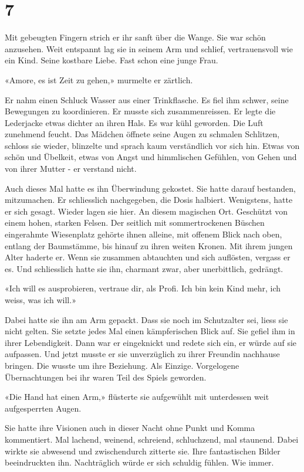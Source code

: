 \chapter{7}



Mit gebeugten Fingern strich er ihr sanft über die Wange. Sie war schön
anzusehen. Weit entspannt lag sie in seinem Arm und schlief, vertrauensvoll wie ein Kind. 
Seine kostbare Liebe. Fast schon eine junge Frau.

«Amore, es ist Zeit zu gehen,» murmelte er zärtlich.
 
Er nahm einen Schluck Wasser aus einer Trinkflasche. Es fiel ihm schwer,
seine Bewegungen zu koordinieren. Er musste sich zusammenreissen.
Er legte die Lederjacke etwas dichter an ihren Hals. Es war kühl
geworden. Die Luft zunehmend feucht.
Das Mädchen öffnete seine Augen zu schmalen Schlitzen, schloss sie
wieder, blinzelte und sprach kaum verständlich vor sich hin. Etwas von
schön und Übelkeit, etwas von Angst und himmlischen Gefühlen, von Gehen
und von ihrer Mutter - er verstand nicht.

Auch dieses Mal hatte es ihn Überwindung gekostet. Sie hatte darauf
bestanden, mitzumachen. Er schliesslich nachgegeben, die Dosis halbiert.
Wenigstens, hatte er sich gesagt.
Wieder lagen sie hier. An diesem magischen Ort. Geschützt von einem
hohen, starken Felsen. Der seitlich mit sommertrockenen Büschen
eingerahmte Wiesenplatz gehörte ihnen alleine, mit offenem Blick nach
oben, entlang der Baumstämme, bis hinauf zu ihren weiten Kronen.
Mit ihrem jungen Alter haderte er. Wenn sie zusammen abtauchten und sich auflösten, 
vergass er es. Und schliesslich hatte sie ihn, charmant
zwar, aber unerbittlich, gedrängt.

«Ich will es ausprobieren, vertraue dir, als Profi. Ich bin kein Kind
mehr, ich weiss, was ich will.»

Dabei hatte sie ihn am Arm gepackt.
Dass sie noch im Schutzalter sei, liess sie nicht gelten. Sie setzte
jedes Mal einen kämpferischen Blick auf. Sie gefiel ihm in ihrer
Lebendigkeit.
Dann war er eingeknickt und redete sich ein, er würde auf sie aufpassen.
Und jetzt musste er sie unverzüglich zu ihrer Freundin nachhause
bringen. Die wusste um ihre Beziehung. Als Einzige. Vorgelogene
Übernachtungen bei ihr waren Teil des Spiels geworden.

«Die Hand hat einen Arm,» flüsterte sie aufgewühlt mit unterdessen weit
aufgesperrten Augen.
 
Sie hatte ihre Visionen auch in dieser Nacht ohne Punkt und Komma
kommentiert. Mal lachend, weinend, schreiend, schluchzend, mal staunend.
Dabei wirkte sie abwesend und zwischendurch zitterte sie.
Ihre fantastischen Bilder beeindruckten ihn. Nachträglich würde er sich
schuldig fühlen. Wie immer.
 
